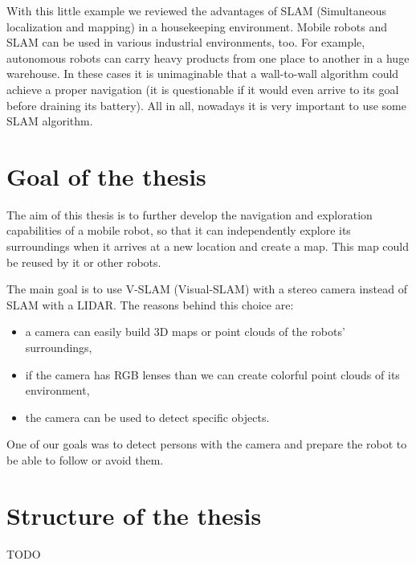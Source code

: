With this little example we reviewed the advantages of SLAM (Simultaneous localization and mapping) in a housekeeping environment. Mobile robots and SLAM can be used in various industrial environments, too. For example, autonomous robots can carry heavy products from one place to another in a huge warehouse. In these cases it is unimaginable that a wall-to-wall algorithm could achieve a proper navigation (it is questionable if it would even arrive to its goal before draining its battery). All in all, nowadays it is very important to use some SLAM algorithm.

\section{Goal of the thesis}

The aim of this thesis is to further develop the navigation and exploration capabilities of a mobile robot, so that it can independently explore its surroundings when it arrives at a new location and create a map. This map could be reused by it or other robots.

The main goal is to use V-SLAM (Visual-SLAM) with a stereo camera instead of SLAM with a LIDAR. The reasons behind this choice are:
\begin{itemize}
    \item a camera can easily build 3D maps or point clouds of the robots' surroundings,
    \item if the camera has RGB lenses than we can create colorful point clouds of its environment,
    \item the camera can be used to detect specific objects.
\end{itemize}
One of our goals was to detect persons with the camera and prepare the robot to be able to follow or avoid them.

\section{Structure of the thesis}

TODO

